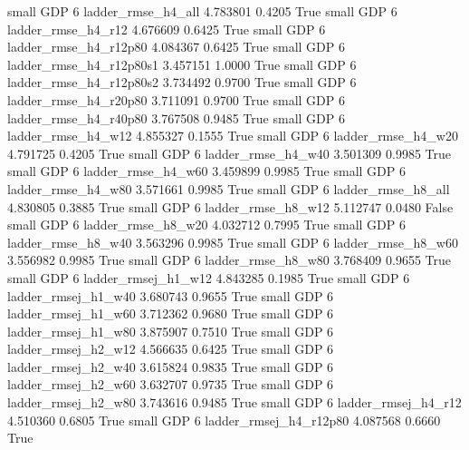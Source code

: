      small      GDP                 6       ladder_rmse_h4_all   4.783801      0.4205    True
     small      GDP                 6       ladder_rmse_h4_r12   4.676609      0.6425    True
     small      GDP                 6    ladder_rmse_h4_r12p80   4.084367      0.6425    True
     small      GDP                 6  ladder_rmse_h4_r12p80s1   3.457151      1.0000    True
     small      GDP                 6  ladder_rmse_h4_r12p80s2   3.734492      0.9700    True
     small      GDP                 6    ladder_rmse_h4_r20p80   3.711091      0.9700    True
     small      GDP                 6    ladder_rmse_h4_r40p80   3.767508      0.9485    True
     small      GDP                 6       ladder_rmse_h4_w12   4.855327      0.1555    True
     small      GDP                 6       ladder_rmse_h4_w20   4.791725      0.4205    True
     small      GDP                 6       ladder_rmse_h4_w40   3.501309      0.9985    True
     small      GDP                 6       ladder_rmse_h4_w60   3.459899      0.9985    True
     small      GDP                 6       ladder_rmse_h4_w80   3.571661      0.9985    True
     small      GDP                 6       ladder_rmse_h8_all   4.830805      0.3885    True
     small      GDP                 6       ladder_rmse_h8_w12   5.112747      0.0480   False
     small      GDP                 6       ladder_rmse_h8_w20   4.032712      0.7995    True
     small      GDP                 6       ladder_rmse_h8_w40   3.563296      0.9985    True
     small      GDP                 6       ladder_rmse_h8_w60   3.556982      0.9985    True
     small      GDP                 6       ladder_rmse_h8_w80   3.768409      0.9655    True
     small      GDP                 6      ladder_rmsej_h1_w12   4.843285      0.1985    True
     small      GDP                 6      ladder_rmsej_h1_w40   3.680743      0.9655    True
     small      GDP                 6      ladder_rmsej_h1_w60   3.712362      0.9680    True
     small      GDP                 6      ladder_rmsej_h1_w80   3.875907      0.7510    True
     small      GDP                 6      ladder_rmsej_h2_w12   4.566635      0.6425    True
     small      GDP                 6      ladder_rmsej_h2_w40   3.615824      0.9835    True
     small      GDP                 6      ladder_rmsej_h2_w60   3.632707      0.9735    True
     small      GDP                 6      ladder_rmsej_h2_w80   3.743616      0.9485    True
     small      GDP                 6      ladder_rmsej_h4_r12   4.510360      0.6805    True
     small      GDP                 6   ladder_rmsej_h4_r12p80   4.087568      0.6660    True
